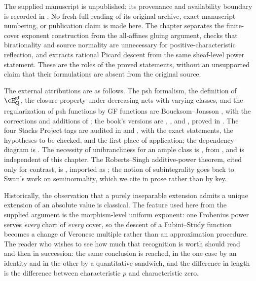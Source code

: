 The supplied manuscript is unpublished; its provenance and availability
boundary is recorded in .  No fresh full reading
of its original archive, exact manuscript numbering, or publication claim
is made here.  The chapter separates the finite-cover exponent construction
from the all-affines gluing argument, checks that birationality and source
normality are unnecessary for positive-characteristic reflection, and
extracts rational Picard descent from the same sheaf-level power statement.
These are the roles of the proved statements, without an unsupported
claim that their formulations are absent from the original source.

The external attributions are as follows.  The psh formalism, the definition
of $\cH^{\mathrm{gf}}_{\mathbf Q}$, the closure property under decreasing
nets with varying classes, and the regularization of psh functions by GF
functions are Boucksom--Jonsson \cite{BJ22}, with the corrections and
additions of \cite{BJ22b}; the book's versions are
, ,
 and , proved in
.  The four Stacks Project tags are audited in
 and
, with the exact statements, the hypotheses to be
checked, and the first place of application; the dependency diagram is
.  The necessity of unibranchness for an
ample class is , from
, and is independent of this chapter.  The
Roberts--Singh additive-power theorem, cited only for contrast, is
\cite{RobertsSingh}, imported as ; the notion of
subintegrality goes back to Swan's work on seminormality, which we cite in
prose rather than by key.

Historically, the observation that a purely inseparable extension admits a
unique extension of an absolute value is classical.  The feature used here from the supplied argument is the
morphism-level uniform exponent:
one Frobenius power serves \emph{every} chart of \emph{every} cover, so the
descent of a Fubini--Study function becomes a change of Veronese multiple
rather than an approximation procedure.  The reader who
wishes to see how much that recognition is worth should read
 and then
 in succession: the same conclusion
is reached, in the one case by an identity and in the other by a
quantitative sandwich, and the difference in length is the difference
between characteristic $p$ and characteristic zero.
